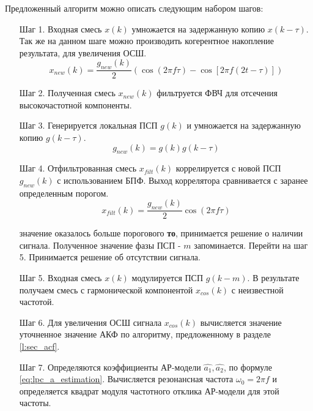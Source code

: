 Предложенный алгоритм можно описать следующим набором шагов:
\begin{itemize}[align=left,style=nextline,leftmargin=*,labelsep=\parindent,font=\normalfont]
\item[Шаг 1.] Входная смесь ${x(k)}$ умножается на задержанную копию ${x(k-\tau)}$. Так же
	на данном шаге можно производить когерентное накопление результата, для
	увеличения ОСШ.
	\begin{equation}
		x_{new}(k) = \frac{g_{new}(k)}{2} \left(\cos (2\pi f \tau) - \cos \left[2 \pi f (2t - \tau)\right]\right)
	\end{equation}

\item[Шаг 2.] Полученная смесь ${x_{new}(k)}$ фильтруется ФВЧ для отсечения высокочастотной компоненты.
\item[Шаг 3.] Генерируется локальная ПСП ${g(k)}$ и умножается на задержанную копию ${g(k-\tau)}$.
	\begin{equation}
		g_{new}(k) = g(k)g(k-\tau)
	\end{equation}

\item[Шаг 4.] Отфильтрованная смесь ${x_{filt}(k)}$ коррелируется с новой ПСП ${g_{new}(k)}$
	с использованием БПФ. Выход коррелятора сравнивается с заранее определенным порогом.
	\begin{equation}
		x_{filt}(k) = \frac{g_{new}(k)}{2} \cos (2\pi f \tau)
	\end{equation}

	  значение оказалось больше порогового {\bf{то}},
		принимается решение о наличии сигнала. Полученное значение фазы ПСП  - ${m}$ запоминается.
		Перейти на шаг 5.
		Принимается решение об отсутствии сигнала.
\item[Шаг 5.] Входная смесь ${x(k)}$ модулируется ПСП ${g(k-m)}$. В результате получаем смесь с гармонической компонентой 
	${x_{cos}(k)}$ с неизвестной частотой.
\item[Шаг 6.] Для увеличения ОСШ сигнала ${x_{cos}(k)}$ вычисляется значение уточненное значение АКФ
	по алгоритму, предложенному в разделе \ref{l:sec_acf}.
\item[Шаг 7.] Определяются коэффициенты АР-модели ${\hat{a_1}, \hat{a_2}}$, по формуле \ref{eq:lpc_a_estimation}. 
	Вычисляется резонансная частота ${\omega_0 = 2 \pi f}$ и определяется квадрат модуля частотного отклика АР-модели для этой частоты. 
\end{itemize}

